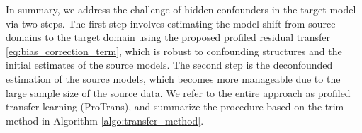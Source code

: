 \documentclass[12pt]{article}
\DeclareMathOperator*{\argmin}{arg\,min}
\begin{document}

In summary, we address the challenge of hidden confounders in the target model via two steps. The first step involves estimating the model shift from source domains to the target domain using the proposed profiled residual transfer \eqref{eq:bias_correction_term}, which is robust to confounding structures and the initial estimates of the source models. The second step is the deconfounded estimation of the source models, which becomes more manageable due to the large sample size of the source data.
We refer to the entire approach as profiled transfer learning (ProTrans), and summarize the procedure based on the trim method in Algorithm \ref{algo:transfer_method}. 
\end{document}
